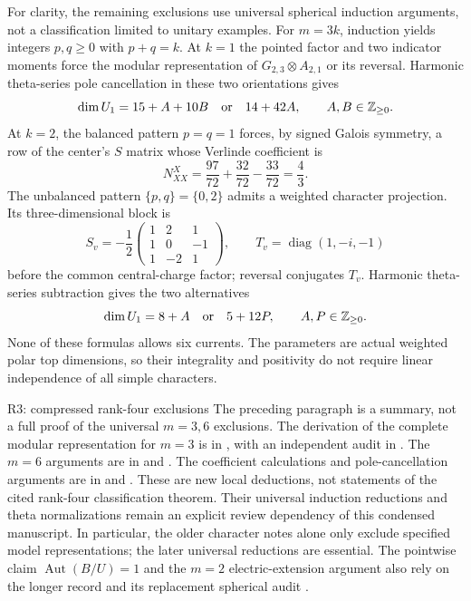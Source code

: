 For clarity, the remaining exclusions use universal spherical
induction arguments, not a classification limited to unitary examples.
For $m=3k$, induction yields integers $p,q\ge0$ with $p+q=k$.
At $k=1$ the pointed factor and two indicator moments force the modular
representation of $G_{2,3}\otimes A_{2,1}$ or its reversal. Harmonic
theta-series pole cancellation in these two orientations gives
\[
 \dim U_1=15+A+10B\quad\hbox{or}\quad14+42A,
 \qquad A,B\in\mathbb Z_{\ge0}.
\]
At $k=2$, the balanced pattern $p=q=1$ forces, by signed Galois symmetry,
a row of the center's $S$ matrix whose Verlinde coefficient is
\[
 N_{XX}^{X}=\frac{97}{72}+\frac{32}{72}-\frac{33}{72}=\frac43.
\]
The unbalanced pattern $\{p,q\}=\{0,2\}$ admits a weighted character
projection. Its three-dimensional block is
\[
 S_v=-\frac12\begin{pmatrix}1&2&1\\1&0&-1\\1&-2&1\end{pmatrix},
 \qquad T_v=\operatorname{diag}(1,-i,-1)
\]
before the common central-charge factor; reversal conjugates $T_v$.
Harmonic theta-series subtraction gives the two alternatives
\[
 \dim U_1=8+A\quad\hbox{or}\quad5+12P,
 \qquad A,P\in\mathbb Z_{\ge0}.
\]
None of these formulas allows six currents. The parameters are actual
weighted polar top dimensions, so their integrality and positivity
do not require linear independence of all simple characters.

\begin{reviewnote}{R3: compressed rank-four exclusions}
The preceding paragraph is a summary, not a full proof of the universal
$m=3,6$ exclusions. The derivation of the complete modular representation
for $m=3$ is in
, with an independent
audit in
.
The $m=6$ arguments are in
 and
.
The coefficient calculations and pole-cancellation arguments are in
and
.
These are new local deductions, not statements of the cited
rank-four classification theorem. Their universal induction reductions
and theta normalizations remain an explicit review dependency of this
condensed manuscript. In particular, the older character notes alone
only exclude specified model representations; the later universal
reductions are essential. The pointwise claim
$\operatorname{Aut}(B/U)=1$ and the $m=2$ electric-extension argument
also rely on the longer record
 and its replacement
spherical audit
.
\end{reviewnote}

